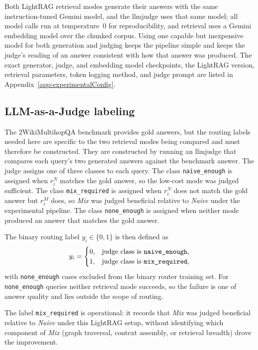 \documentclass[english, bibtex]{kththesis}               %
\numberwithin{listing}{chapter}
\begin{document}
Both LightRAG retrieval modes generate their answers with the same instruction-tuned Gemini model, and the \gls{llmjudge} uses that same model; all model calls run at temperature~$0$ for reproducibility, and retrieval uses a Gemini embedding model over the chunked corpus. Using one capable but inexpensive model for both generation and judging keeps the pipeline simple and keeps the judge's reading of an answer consistent with how that answer was produced. The exact generator, judge, and embedding model checkpoints, the LightRAG version, retrieval parameters, token logging method, and judge prompt are listed in Appendix~\ref{app:experimentalConfig}.

\subsection{LLM-as-a-Judge labeling}
\label{sec:methodJudge}

The 2WikiMultihopQA benchmark provides gold answers, but the routing labels needed here are specific to the two retrieval modes being compared and must therefore be constructed. They are constructed by running an \gls{llmjudge} \cite{zheng2023judge} that compares each query's two generated answers against the benchmark answer. The judge assigns one of three classes to each query. The class \texttt{naive\_enough} is assigned when \(r_i^N\) matches the gold answer, so the low-cost mode was judged sufficient. The class \texttt{mix\_required} is assigned when \(r_i^N\) does not match the gold answer but \(r_i^M\) does, so \emph{Mix} was judged beneficial relative to \emph{Naive} under the experimental pipeline. The class \texttt{none\_enough} is assigned when neither mode produced an answer that matches the gold answer.

The binary routing label \(y_i \in \{0, 1\}\) is then defined as
\begin{equation}
\label{eq:routingLabel}
y_i =
\begin{cases}
0, & \text{judge class is \texttt{naive\_enough},}\\
1, & \text{judge class is \texttt{mix\_required},}
\end{cases}
\end{equation}
with \texttt{none\_enough} cases excluded from the binary router training set. For \texttt{none\_enough} queries neither retrieval mode succeeds, so the failure is one of answer quality and lies outside the scope of routing.

The label \texttt{mix\_required} is operational: it records that \emph{Mix} was judged beneficial relative to \emph{Naive} under this LightRAG setup, without identifying which component of \emph{Mix} (graph traversal, context assembly, or retrieval breadth) drove the improvement.
\end{document}
